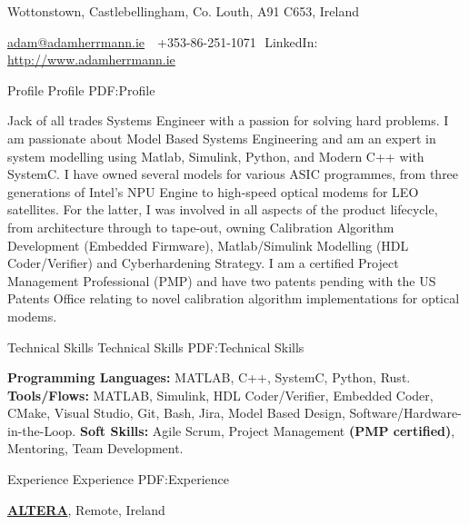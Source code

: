 \documentclass[letterpaper,MMMyyyy,nonstopmode]{simpleresumecv}
\newcommand{\CVAuthor}{Adam Herrmann}
\newcommand{\CVWebpage}{http://www.adamherrmann.ie}
\begin{document}

\Title{\CVAuthor}

\begin{SubTitle}
Wottonstown, Castlebellingham, Co. Louth, A91 C653, Ireland
\par
\href{mailto:adam@adamherrmann.ie}
{adam@adamherrmann.ie}
\,\SubBulletSymbol\,
+353-86-251-1071
\,\SubBulletSymbol\,LinkedIn:
\href{\CVWebpage}
{\url{\CVWebpage}}
\end{SubTitle}

\begin{Body}


\Section
{Profile}
{Profile}
{PDF:Profile}

\Entry
Jack of all trades Systems Engineer with a passion for solving hard problems. I am passionate about Model Based Systems Engineering and am an expert in system modelling using Matlab, Simulink, Python, and Modern C++ with SystemC. I have owned several models for various ASIC programmes, from three generations of Intel's NPU Engine to high-speed optical modems for LEO satellites. For the latter, I was involved in all aspects of the product lifecycle, from architecture through to tape-out, owning Calibration Algorithm Development (Embedded Firmware), Matlab/Simulink Modelling (HDL Coder/Verifier) and Cyberhardening Strategy. I am a certified Project Management Professional (PMP) and have two patents pending with the US Patents Office relating to novel calibration algorithm implementations for optical modems.


\Section
{Technical Skills}
{Technical Skills}
{PDF:Technical Skills}

\textbf{Programming Languages:} MATLAB, C++, SystemC, Python, Rust.
\Gap
\textbf{Tools/Flows:} MATLAB, Simulink, HDL Coder/Verifier, Embedded Coder, CMake, Visual Studio, Git, Bash, Jira, Model Based Design, Software/Hardware-in-the-Loop.
\Gap
\textbf{Soft Skills:} Agile Scrum, Project Management \textbf{(PMP certified)}, Mentoring, Team Development.


\Section
{Experience}
{Experience}
{PDF:Experience}

\Entry
\href{http://www.altera.com}
{\textbf{ALTERA}},
Remote, Ireland


\end{Body}
\end{document}
